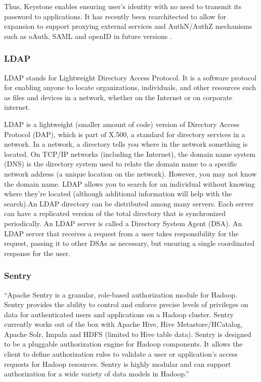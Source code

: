      Thus, Keystone enables ensuring user’s identity with no need to
     transmit its password to applications. It has recently been
     rearchitected to allow for expansion to support proxying external
     services and AuthN/AuthZ mechanisms such as oAuth, SAML and
     openID in future versions \cite{www-keystone}.

\subsubsection{LDAP}

     LDAP stands for Lightweight Directory Access Protocol. It is a software
     protocol for enabling anyone to locate organizations, individuals, and
     other resources such as files and devices in a network, whether on the
     Internet or on corporate internet.
     \cite{www-ldap}

     LDAP is a lightweight (smaller amount of code) version of
     Directory Access Protocol (DAP), which is part of X.500, a
     standard for directory services in a network.  In a network, a
     directory tells you where in the network something is located. On
     TCP/IP networks (including the Internet), the domain name system
     (DNS) is the directory system used to relate the domain name to a
     specific network address (a unique location on the
     network). However, you may not know the domain name. LDAP allows
     you to search for an individual without knowing where they're
     located (although additional information will help with the
     search).An LDAP directory can be distributed among many
     servers. Each server can have a replicated version of the total
     directory that is synchronized periodically.  An LDAP server is
     called a Directory System Agent (DSA). An LDAP server that
     receives a request from a user takes responsibility for the
     request, passing it to other DSAs as necessary, but ensuring a
     single coordinated response for the user.

\subsubsection{Sentry}

     ``Apache Sentry \cite{www-sentry}  is a granular, role-based authorization 
     module for Hadoop. Sentry provides the ability to control and enforce 
     precise levels of privileges on data for authenticated users and 
     applications on a Hadoop cluster. Sentry currently works out of the box 
     with Apache Hive, Hive Metastore/HCatalog, Apache Solr, Impala and HDFS 
     (limited to Hive table data). Sentry is designed to be a pluggable 
     authorization engine for Hadoop components. It allows the client to define 
     authorization rules to validate a user or application’s access requests 
     for Hadoop resources. Sentry is highly modular and can support authorization 
     for a wide variety of data models in Hadoop.''

